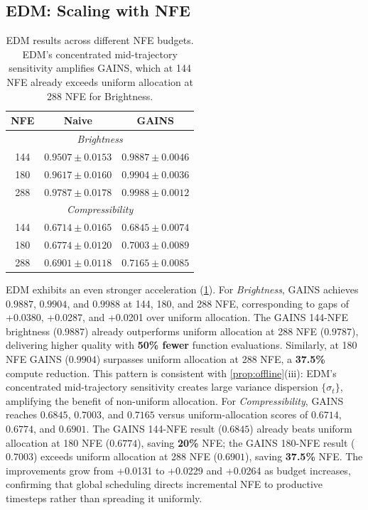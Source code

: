 \subsection{EDM: Scaling with NFE}
\label{sec:exp-edm-scaling}
\begin{table}[t]
\centering
\caption{EDM results across different NFE budgets.
EDM's concentrated mid-trajectory sensitivity amplifies GAINS, which at 144 NFE already exceeds uniform allocation at 288 NFE for Brightness.}
\label{tab:edm_budget}
\begin{tabular}{c|c|c}
\toprule
\textbf{NFE} & \textbf{Naive} & \textbf{GAINS} \\
\midrule
\multicolumn{3}{c}{\textit{Brightness}} \\
\midrule
144 & $0.9507 \pm 0.0153$ & $0.9887 \pm 0.0046$ \\
180 & $0.9617 \pm 0.0160$ & $0.9904 \pm 0.0036$ \\
288 & $0.9787 \pm 0.0178$ & $0.9988 \pm 0.0012$ \\
\midrule
\multicolumn{3}{c}{\textit{Compressibility}} \\
\midrule
144 & $0.6714 \pm 0.0165$ & $0.6845 \pm 0.0074$ \\
180 & $0.6774 \pm 0.0120$ & $0.7003 \pm 0.0089$ \\
288 & $0.6901 \pm 0.0118$ & $0.7165 \pm 0.0085$ \\
\bottomrule
\end{tabular}
\end{table}
EDM exhibits an even stronger acceleration (\cref{tab:edm_budget}).
For \textit{Brightness}, GAINS achieves
$0.9887$, $0.9904$, and $0.9988$ at 144, 180, and 288 NFE, corresponding to gaps of +0.0380, +0.0287,
and +0.0201 over uniform allocation.
The GAINS 144-NFE brightness ($0.9887$) already outperforms uniform allocation at
288 NFE ($0.9787$), delivering higher quality with \textbf{50\% fewer}
function evaluations.
Similarly, at 180 NFE GAINS ($0.9904$) surpasses uniform allocation at 288 NFE,
a \textbf{37.5\%} compute reduction.
This pattern is consistent with \cref{prop:offline}(iii): EDM's concentrated
mid-trajectory sensitivity creates large variance dispersion $\{\sigma_t\}$,
amplifying the benefit of non-uniform allocation.
For \textit{Compressibility}, GAINS reaches $0.6845$, $0.7003$, and $0.7165$
versus uniform-allocation scores of $0.6714$, $0.6774$, and $0.6901$.
The GAINS 144-NFE result ($0.6845$) already beats uniform allocation at 180 NFE
($0.6774$), saving \textbf{20\%} NFE;
the GAINS 180-NFE result ($0.7003$) exceeds uniform allocation at 288 NFE ($0.6901$),
saving \textbf{37.5\%} NFE.
The improvements grow from +0.0131 to +0.0229 and
+0.0264 as budget increases, confirming that global scheduling directs
incremental NFE to productive timesteps rather than spreading it uniformly.

